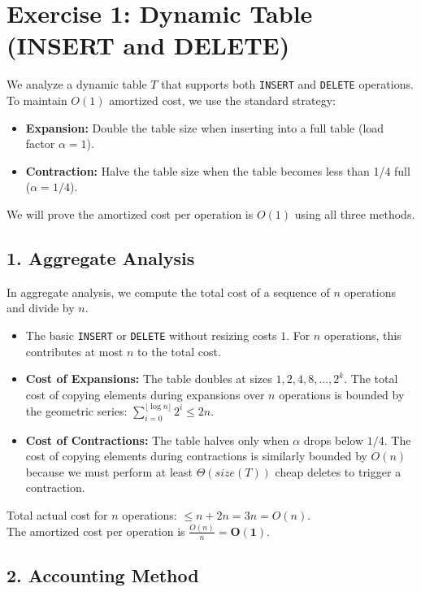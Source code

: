 \documentclass[12pt]{article}
\begin{document}
\section*{Exercise 1: Dynamic Table (INSERT and DELETE)}

We analyze a dynamic table $T$ that supports both \texttt{INSERT} and \texttt{DELETE} operations. To maintain $O(1)$ amortized cost, we use the standard strategy:
\begin{itemize}
    \item \textbf{Expansion:} Double the table size when inserting into a full table (load factor $\alpha = 1$).
    \item \textbf{Contraction:} Halve the table size when the table becomes less than 1/4 full ($\alpha = 1/4$).
\end{itemize}
We will prove the amortized cost per operation is $O(1)$ using all three methods.

\subsection*{1. Aggregate Analysis}
In aggregate analysis, we compute the total cost of a sequence of $n$ operations and divide by $n$.
\begin{itemize}
    \item The basic \texttt{INSERT} or \texttt{DELETE} without resizing costs $1$. For $n$ operations, this contributes at most $n$ to the total cost.
    \item \textbf{Cost of Expansions:} The table doubles at sizes $1, 2, 4, 8, \dots, 2^k$. The total cost of copying elements during expansions over $n$ operations is bounded by the geometric series: $\sum_{i=0}^{\lfloor \log n \rfloor} 2^i \le 2n$.
    \item \textbf{Cost of Contractions:} The table halves only when $\alpha$ drops below $1/4$. The cost of copying elements during contractions is similarly bounded by $O(n)$ because we must perform at least $\Theta(size(T))$ cheap deletes to trigger a contraction.
\end{itemize}
Total actual cost for $n$ operations: $\le n + 2n = 3n= O(n)$. \\
The amortized cost per operation is $\frac{O(n)}{n} = \mathbf{O(1)}$.

\subsection*{2. Accounting Method}
\end{document}
